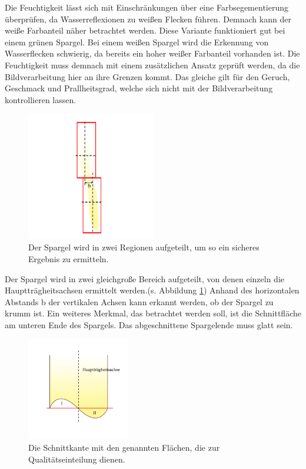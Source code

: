 \documentclass{ezb}
\begin{document}
\linebreak
Die Feuchtigkeit lässt sich mit Einschränkungen über eine Farbsegementierung überprüfen, da Wasserreflexionen zu weißen Flecken führen. Demnach kann der weiße Farbanteil näher betrachtet werden. Diese Variante funktioniert gut bei einem grünen Spargel. Bei einem weißen Spargel wird die Erkennung von Wasserflecken schwierig, da bereits ein hoher weißer Farbanteil vorhanden ist. Die Feuchtigkeit muss demnach mit einem zusätzlichen Ansatz geprüft werden, da die Bildverarbeitung hier an ihre Grenzen kommt. Das gleiche gilt für den Geruch, Geschmack und Prallheitsgrad, welche sich nicht mit der Bildverarbeitung kontrollieren lassen.
\begin{figure}
\includegraphics[width=0.5\textwidth]{schief.png}
\caption{\label{fig:schief}Der Spargel wird in zwei Regionen aufgeteilt, um so ein sicheres Ergebnis zu ermitteln.}
\end{figure}
Der Spargel wird in zwei gleichgroße Bereich aufgeteilt, von denen einzeln die Hauptträgheitsachsen ermittelt werden.(s. Abbildung \ref{fig:schief})
Anhand des horizontalen Abstands b der vertikalen Achsen kann erkannt werden, ob der Spargel zu krumm ist.
\clearpage
Ein weiteres Merkmal, das betrachtet werden soll, ist die Schnittfläche am unteren Ende des Spargels. Das abgeschnittene Spargelende muss glatt sein.\\
\begin{figure}
\includegraphics[width=0.4\textwidth]{schnitt.png}
\caption{\label{fig:schnitt}Die Schnittkante mit den genannten Flächen, die zur Qualitätseinteilung dienen.}
\end{figure}
\end{document}
